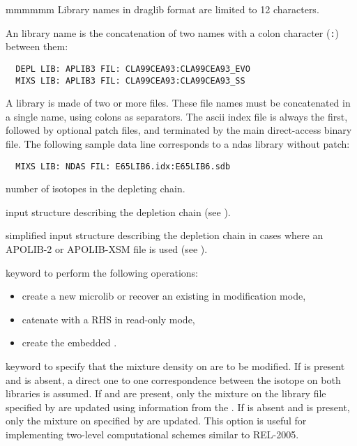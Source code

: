 \begin{ListeDeDescription}{mmmmmm}
Library names in {\sc draglib} format are limited to 12 characters.

An  library name is the concatenation of two names with a colon character ({\tt :}) between them:
\begin{verbatim}
  DEPL LIB: APLIB3 FIL: CLA99CEA93:CLA99CEA93_EVO
  MIXS LIB: APLIB3 FIL: CLA99CEA93:CLA99CEA93_SS
\end{verbatim}

A  library is made of two or more files. These file names must be concatenated in a single
 name, using colons as separators. The {\sc ascii} index file is always the first,
followed by optional patch files, and terminated by the main direct-access binary file. The
following sample data line corresponds to a {\sc ndas} library without patch:
\begin{verbatim}
  MIXS LIB: NDAS FIL: E65LIB6.idx:E65LIB6.sdb
\end{verbatim}

\item[\dusa{ndepl}] number of isotopes in the depleting chain.

\item[\dstr{descdepl}] input structure describing the
depletion chain (see ).

\item[\dstr{descdeplA2}] simplified input structure describing the
depletion chain in cases where an APOLIB-2 or APOLIB-XSM file is used (see ).

\item[\moc{CATL}] keyword to perform the following operations:
\vspace{-0.15cm}
\begin{itemize}
\item create a new microlib or recover an existing  in modification mode,
\item catenate with a RHS  in read-only mode,
\item create the embedded  .
\end{itemize}

\item[\moc{MAXS}] keyword to specify that the mixture density on 
are to be modified. If  is present and  is absent, a
direct one to one correspondence between the isotope on both libraries is
assumed. If  and  are present, only the
mixture on the library file specified by  are updated using
information from the . If  is absent and
 is present, only the mixture on   specified by
 are updated. This option is useful for implementing two-level
computational schemes similar to REL-2005.


\end{ListeDeDescription}
